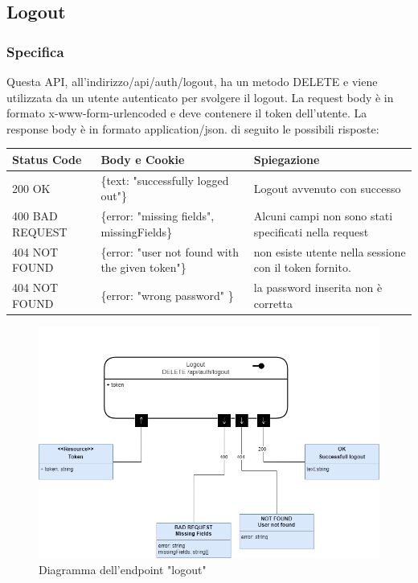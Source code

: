 \documentclass{report}
\begin{document}
\subsection{Logout}
\subsubsection*{Specifica}


Questa API, all'indirizzo/api/auth/logout, ha un metodo DELETE e viene utilizzata da un utente autenticato per svolgere il logout.
La request body è in formato x-www-form-urlencoded e deve contenere il token dell'utente.
La response body è in formato application/json. di seguito le possibili risposte:
\begin{center} %
	\centering
	\begin{tabular}{ |p{4cm}|p{5cm}|p{4cm}| }
		\hline
		\centering Status Code & \qquad\quad Body e Cookie & \qquad\qquad Spiegazione\\ %
		\hline
		200 OK & \{text: "successfully logged out"\} & Logout avvenuto con successo 	\\
		\hline
		400 BAD REQUEST & \{error: "missing fields", missingFields\} & Alcuni campi non sono stati specificati nella request\\ %
		\hline
		404 NOT FOUND & \{error: "user not found with the given token"\} & non esiste utente nella sessione con il token fornito.\\%
		\hline
		404 NOT FOUND & \{error: "wrong password" \} & la password inserita non è corretta \\
		\hline
		
	\end{tabular}
\end{center}
\begin{figure}[H]
	\centering\includegraphics[width=1\textwidth]{images/microservizio-autenticazione/diagrams/diagramma_logout.drawio.png}
	\caption{Diagramma dell'endpoint "logout"}
\end{figure}
\end{document}
